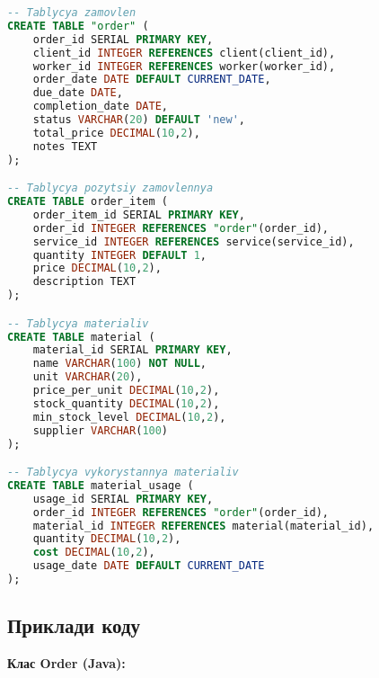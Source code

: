 \documentclass[14pt,a4paper]{extarticle}
\begin{document}
\newpage
\begin{lstlisting}[language=SQL, caption=Продовження створення таблиць, basicstyle=\small\ttfamily, breaklines=true, frame=single]
-- Tablycya zamovlen
CREATE TABLE "order" (
    order_id SERIAL PRIMARY KEY,
    client_id INTEGER REFERENCES client(client_id),
    worker_id INTEGER REFERENCES worker(worker_id),
    order_date DATE DEFAULT CURRENT_DATE,
    due_date DATE,
    completion_date DATE,
    status VARCHAR(20) DEFAULT 'new',
    total_price DECIMAL(10,2),
    notes TEXT
);

-- Tablycya pozytsiy zamovlennya
CREATE TABLE order_item (
    order_item_id SERIAL PRIMARY KEY,
    order_id INTEGER REFERENCES "order"(order_id),
    service_id INTEGER REFERENCES service(service_id),
    quantity INTEGER DEFAULT 1,
    price DECIMAL(10,2),
    description TEXT
);

-- Tablycya materialiv
CREATE TABLE material (
    material_id SERIAL PRIMARY KEY,
    name VARCHAR(100) NOT NULL,
    unit VARCHAR(20),
    price_per_unit DECIMAL(10,2),
    stock_quantity DECIMAL(10,2),
    min_stock_level DECIMAL(10,2),
    supplier VARCHAR(100)
);

-- Tablycya vykorystannya materialiv
CREATE TABLE material_usage (
    usage_id SERIAL PRIMARY KEY,
    order_id INTEGER REFERENCES "order"(order_id),
    material_id INTEGER REFERENCES material(material_id),
    quantity DECIMAL(10,2),
    cost DECIMAL(10,2),
    usage_date DATE DEFAULT CURRENT_DATE
);
\end{lstlisting}

\newpage
\subsection{Приклади коду}

\textbf{Клас Order (Java):}
\end{document}
